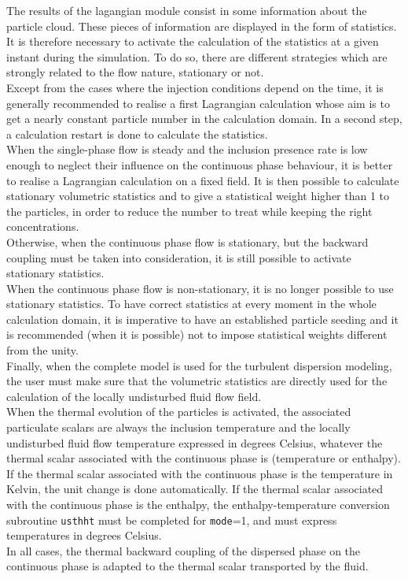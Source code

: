 {{{\noindent
The results of the lagangian module consist in some information about
the particle cloud. These pieces of information are displayed in the
form of statistics. It is therefore necessary to activate the
calculation of the statistics at a given instant during the
simulation. To do so, there are different strategies which are strongly
related to the flow nature, stationary or not. \\
Except from the cases where the injection conditions depend on the time,
it is generally recommended to realise a first Lagrangian calculation
whose aim is to get a nearly constant particle number in the calculation
domain. In a second step, a calculation restart is done to calculate the
statistics. \\
When the single-phase flow is steady and the inclusion presence rate
is low enough to neglect their influence on the continuous phase
behaviour, it is better to realise a Lagrangian calculation on a fixed
field. It is then possible to calculate stationary volumetric statistics and
to give a statistical weight higher than 1 to the particles, in order to
reduce the number to treat while keeping the right concentrations. \\
Otherwise, when the continuous phase flow is stationary, but the backward
coupling must be taken into consideration, it is still possible to
activate stationary statistics. \\
When the continuous phase flow is non-stationary, it is no longer possible
to use stationary statistics. To have correct statistics at every moment
in the whole calculation domain, it is imperative to have an established
particle seeding and it is recommended (when it is possible) not to
impose statistical weights different from the unity. \\
Finally, when the complete model is used for the turbulent dispersion
modeling, the user must make sure that the volumetric statistics are
directly used for the calculation of the locally undisturbed fluid flow
field. \\
\noindent
When the thermal evolution of the particles is activated, the associated
particulate scalars are always the inclusion temperature and the locally
undisturbed fluid flow
temperature expressed in degrees Celsius, whatever the thermal scalar
associated with the continuous phase is (temperature or enthalpy). If the
thermal scalar associated with the continuous phase is the temperature
in Kelvin, the unit change is done automatically. If the
thermal scalar associated with the continuous phase is the enthalpy, the
enthalpy-temperature conversion subroutine \texttt{usthht} must be
completed for \texttt{mode}=1, and must express temperatures in degrees
Celsius. \\
In all cases, the thermal backward coupling of the dispersed phase on
the continuous phase is adapted to the thermal scalar transported by the
fluid.

}}}
